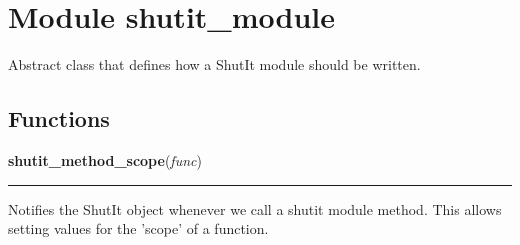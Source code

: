 %
%
%


\section{Module shutit\_module}

    \label{shutit_module}
Abstract class that defines how a ShutIt module should be written.



  \subsection{Functions}

    \label{shutit_module:shutit_method_scope}

    \vspace{0.5ex}

\hspace{.8\funcindent}\begin{boxedminipage}{\funcwidth}

    \raggedright \textbf{shutit\_method\_scope}(\textit{func})

    \vspace{-1.5ex}

    \rule{\textwidth}{0.5\fboxrule}
\setlength{\parskip}{2ex}
    Notifies the ShutIt object whenever we call a shutit module method. 
    This allows setting values for the 'scope' of a function.

\setlength{\parskip}{1ex}
    \end{boxedminipage}



